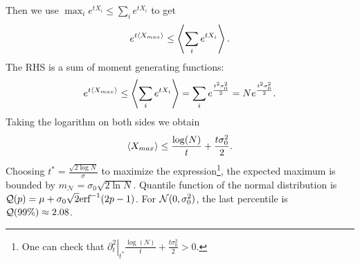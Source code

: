 \documentclass[FinalReport.tex]{subfiles}
\begin{document}
Then we use $\max_i e^{tX_i}\leq \sum_i e^{tX_i}$ to get 
\begin{equation}
	e^{t\expval{X_{max}}}\leq  \expval{\sum_{i}e^{tX_i}}.
\end{equation}
The RHS is a sum of moment generating functions:
\begin{equation}
	e^{t\expval{X_{max}}}\leq \expval{\sum_{i}e^{tX_i}}= \sum_{i} e^{\frac{t^2\sigma_0^2}{2}}=Ne^{\frac{t^2\sigma_0^2}{2}}.
\end{equation}
Taking the logarithm on both sides we obtain
\begin{equation}
	\expval{X_{max}}\leq \frac{\log(N)}{t}+\frac{t\sigma_0^2}{2}.	
\end{equation}
Choosing $t^*=\frac{\sqrt{2\log{N}}}{\sigma}$ to maximize the expression\footnote{One can check that $\left.\partial^2_t\right\vert_{t^*}\frac{\log(N)}{t}+\frac{t\sigma_0^2}{2}>0$.}, the expected maximum is bounded by $m_\mathcal{N}=\sigma_0\sqrt{2\ln{N}}$. Quantile function of the normal distribution is $\mathcal{Q}(p)=\mu+\sigma_0\sqrt{2}\textrm{erf}^{-1}(2p-1)$. For $\mathcal{N}(0,\sigma_0^2)$, the last percentile is $\mathcal{Q}(99\%)\approx2.08$.



	
\end{document}
